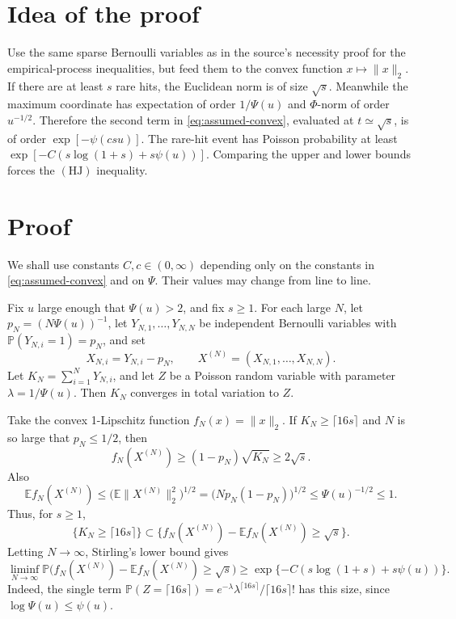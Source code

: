 \documentclass[11pt]{amsart}
\theoremstyle{remark}
\newcommand{\E}{\mathbb E}
\newcommand{\Pp}{\mathbb P}
\begin{document}
\section*{Idea of the proof}

Use the same sparse Bernoulli variables as in the source's necessity proof for
the empirical-process inequalities, but feed them to the convex function
\(x\mapsto \|x\|_2\).  If there are at least \(s\) rare hits, the Euclidean
norm is of size \(\sqrt{s}\).  Meanwhile the maximum coordinate has expectation
of order \(1/\Psi(u)\) and \(\Phi\)-norm of order \(u^{-1/2}\).  Therefore the
second term in \eqref{eq:assumed-convex}, evaluated at \(t\simeq\sqrt{s}\), is
of order \(\exp[-\psi(csu)]\).  The rare-hit event has Poisson probability at
least \(\exp[-C(s\log(1+s)+s\psi(u))]\).  Comparing the upper and lower bounds
forces the \((\mathrm{HJ})\) inequality.

\section*{Proof}

We shall use constants \(C,c\in(0,\infty)\) depending only on the constants in
\eqref{eq:assumed-convex} and on \(\Psi\).  Their values may change from line
to line.

Fix \(u\) large enough that \(\Psi(u)>2\), and fix \(s\ge 1\).  For each
large \(N\), let \(p_N=(N\Psi(u))^{-1}\), let
\(Y_{N,1},\ldots,Y_{N,N}\) be independent Bernoulli variables with
\(\Pp(Y_{N,i}=1)=p_N\), and set
\[
        X_{N,i}=Y_{N,i}-p_N,\qquad
        X^{(N)}=(X_{N,1},\ldots,X_{N,N}).
\]
Let \(K_N=\sum_{i=1}^N Y_{N,i}\), and let \(Z\) be a Poisson random variable
with parameter \(\lambda=1/\Psi(u)\).  Then \(K_N\) converges in total
variation to \(Z\).

Take the convex 1-Lipschitz function \(f_N(x)=\|x\|_2\).  If
\(K_N\ge \lceil 16s\rceil\) and \(N\) is so large that \(p_N\le 1/2\), then
\[
        f_N(X^{(N)})\ge (1-p_N)\sqrt{K_N}\ge 2\sqrt{s}.
\]
Also
\[
        \E f_N(X^{(N)})
        \le \bigl(\E \|X^{(N)}\|_2^2\bigr)^{1/2}
        = \bigl(Np_N(1-p_N)\bigr)^{1/2}
        \le \Psi(u)^{-1/2}\le 1.
\]
Thus, for \(s\ge 1\),
\[
        \{K_N\ge \lceil 16s\rceil\}
        \subset
        \{f_N(X^{(N)})-\E f_N(X^{(N)})\ge \sqrt{s}\}.
\]
Letting \(N\to\infty\), Stirling's lower bound gives
\begin{equation}\label{eq:poisson-lower}
\liminf_{N\to\infty}
\Pp\bigl(f_N(X^{(N)})-\E f_N(X^{(N)})\ge \sqrt{s}\bigr)
\ge
\exp\{-C(s\log(1+s)+s\psi(u))\}.
\end{equation}
Indeed, the single term
\(\Pp(Z=\lceil 16s\rceil)=e^{-\lambda}\lambda^{\lceil 16s\rceil}/\lceil
16s\rceil!\) has this size, since
\(\log\Psi(u)\le \psi(u)\).
\end{document}
